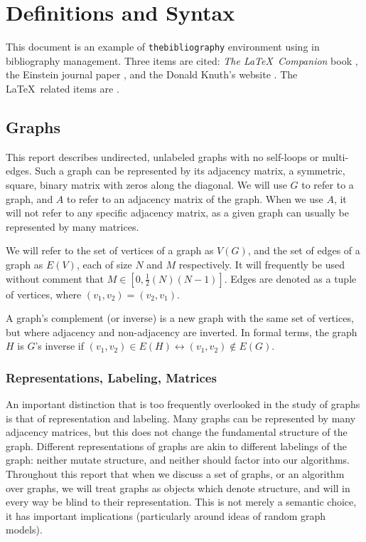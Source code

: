 \documentclass[11pt,a4paper]{report}
\begin{document}
\chapter{Definitions and Syntax}



This document is an example of \texttt{thebibliography} environment using 
in bibliography management. Three items are cited: \textit{The \LaTeX\ Companion} 
book \cite{latexcompanion}, the Einstein journal paper \cite{einstein}, and the 
Donald Knuth's website \cite{knuthwebsite}. The \LaTeX\ related items are
\cite{latexcompanion,knuthwebsite}. 

\section{Graphs}
This report describes undirected, unlabeled graphs with no self-loops or multi-edges.
Such a graph can be represented by its adjacency matrix, a symmetric, square, binary matrix with zeros along the diagonal.
We will use $G$ to refer to a graph, and $A$ to refer to an adjacency matrix of the graph.
When we use $A$, it will not refer to any specific adjacency matrix, as a given graph can usually be represented by many matrices.

We will refer to the set of vertices of a graph as $V(G)$, and the set of edges of a graph as $E(V)$, each of size $N$ and $M$ respectively. 
It will frequently be used without comment that $M \in [0, \frac{1}{2}(N)(N-1)]$.
Edges are denoted as a tuple of vertices, where $(v_1, v_2) = (v_2, v_1)$.

A graph's complement (or inverse) is a new graph with the same set of vertices, but where adjacency and non-adjacency are inverted.
In formal terms, the graph $H$ is $G$'s inverse if $(v_1, v_2) \in E(H) \leftrightarrow (v_1, v_2) \notin E(G)$.

\subsection{Representations, Labeling, Matrices}
An important distinction that is too frequently overlooked in the study of graphs is that of representation and labeling.
Many graphs can be represented by many adjacency matrices, but this does not change the fundamental structure of the graph.
Different representations of graphs are akin to different labelings of the graph: neither mutate structure, and neither should factor into our algorithms.
Throughout this report that when we discuss a set of graphs, or an algorithm over graphs, we will treat graphs as objects which denote structure, and will in every way be blind to their representation.
This is not merely a semantic choice, it has important implications (particularly around ideas of random graph models).
\end{document}
